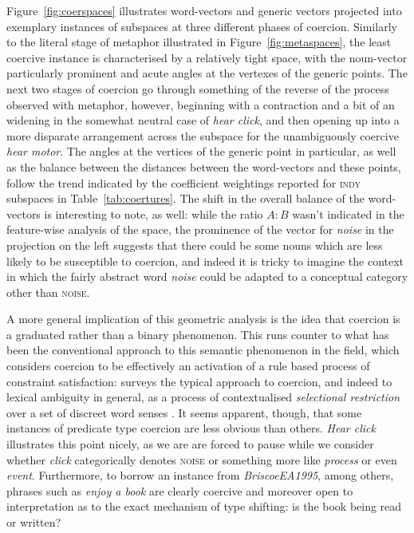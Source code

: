 Figure~\ref{fig:coerspaces} illustrates word-vectors and generic vectors projected into exemplary instances of subspaces at three different phases of coercion.  Similarly to the literal stage of metaphor illustrated in Figure~\ref{fig:metaspaces}, the least coercive instance is characterised by a relatively tight space, with the noun-vector particularly prominent and acute angles at the vertexes of the generic points.  The next two stages of coercion go through something of the reverse of the process observed with metaphor, however, beginning with a contraction and a bit of an widening in the somewhat neutral case of \emph{hear click}, and then opening up into a more disparate arrangement across the subspace for the unambiguously coercive \emph{hear motor}.  The angles at the vertices of the generic point in particular, as well as the balance between the distances between the word-vectors and these points, follow the trend indicated by the coefficient weightings reported for \textsc{indy} subspaces in Table~\ref{tab:coertures}.  The shift in the overall balance of the word-vectors is interesting to note, as well: while the ratio $A:B$ wasn't indicated in the feature-wise analysis of the space, the prominence of the vector for \emph{noise} in the projection on the left suggests that there could be some nouns which are less likely to be susceptible to coercion, and indeed it is tricky to imagine the context in which the fairly abstract word \emph{noise} could be adapted to a conceptual category other than \textsc{noise}.

A more general implication of this geometric analysis is the idea that coercion is a graduated rather than a binary phenomenon.  This runs counter to what has been the conventional approach to this semantic phenomenon in the field, which considers coercion to be effectively an activation of a rule based process of constraint satisfaction: \cite{Pustejovsky} surveys the typical approach to coercion, and indeed to lexical ambiguity in general, as a process of contextualised \emph{selectional restriction} over a set of discreet word senses \citep[though see][for computational applications of a probabilistic, corpus based model]{LapataEA2003,ShutovaEA2013b}.  It seems apparent, though, that some instances of predicate type coercion are less obvious than others.  \emph{Hear click} illustrates this point nicely, as we are are forced to pause while we consider whether \emph{click} categorically denotes \textsc{noise} or something more like \emph{process} or even \emph{event}.  Furthermore, to borrow an instance from \emph{BriscoeEA1995}, among others, phrases such as \emph{enjoy a book} are clearly coercive and moreover open to interpretation as to the exact mechanism of type shifting: is the book being read or written?

